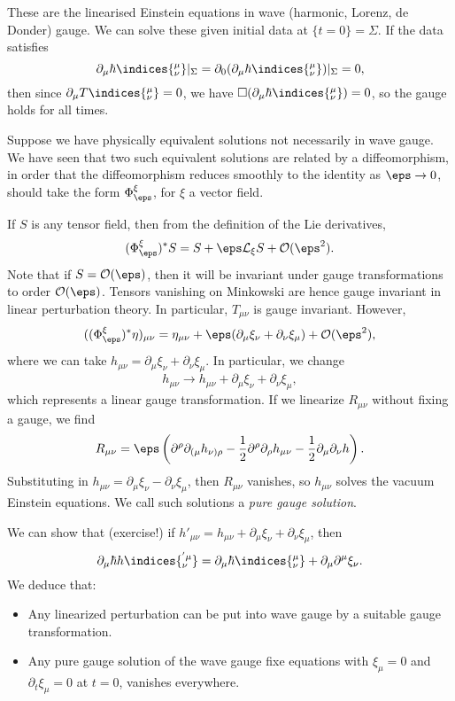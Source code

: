 \documentclass[12pt]{article}
\begin{document}
These are the linearised Einstein equations in wave (harmonic, Lorenz, de Donder) gauge. We can solve these given initial data at $\{t = 0\} = \Sigma$. If the data satisfies
\[
\partial_\mu \hbar\indices{^{\mu}_{\nu}} |_\Sigma = \partial_0(\partial_\mu \hbar\indices{^{\mu}_{\nu}})|_\Sigma = 0,
\]
then since $\partial_\mu T\indices{^{\mu}_{\nu}} = 0$, we have $\square (\partial_\mu \hbar\indices{^{\mu}_{\nu}}) = 0$, so the gauge holds for all times.

Suppose we have physically equivalent solutions not necessarily in wave gauge. We have seen that two such equivalent solutions are related by a diffeomorphism, in order that the diffeomorphism reduces smoothly to the identity as $\eps \to 0$, should take the form $\Phi^{\xi}_\eps$, for $\xi$ a vector field.

If $S$ is any tensor field, then from the definition of the Lie derivatives,
\[
	(\Phi^{\xi}_\eps)^{\ast} S = S + \eps \mathcal{L}_\xi S + \mathcal{O}(\eps^2).
\]
Note that if $S = \mathcal{O}(\eps)$, then it will be invariant under gauge transformations to order $\mathcal{O}(\eps)$. Tensors vanishing on Minkowski are hence gauge invariant in linear perturbation theory. In particular, $T_{\mu\nu}$ is gauge invariant. However,
\[
	((\Phi^\xi_\eps)^{\ast} \eta)_{\mu\nu} = \eta_{\mu\nu} + \eps (\partial_\mu \xi_\nu + \partial_\nu \xi_\mu) + \mathcal{O}(\eps ^2),
\]
where we can take $h_{\mu\nu} = \partial_\mu \xi_\nu + \partial_\nu \xi_\mu$. In particular, we change
\[
h_{\mu\nu} \to h_{\mu\nu} + \partial_\mu \xi_\nu + \partial_\nu \xi_\mu,
\]
which represents a linear gauge transformation. If we linearize $R_{\mu\nu}$ without fixing a gauge, we find
\[
R_{\mu\nu} = \eps\left(\partial^\rho \partial_{(\mu} h_{\nu)\rho} - \frac{1}{2} \partial^\rho \partial_\rho h_{\mu\nu} - \frac 12 \partial_\mu \partial_\nu h \right).
\]
Substituting in $h_{\mu\nu} = \partial_\mu \xi_\nu - \partial_\nu \xi_\mu$, then $R_{\mu\nu}$ vanishes, so $h_{\mu\nu}$ solves the vacuum Einstein equations. We call such solutions a \emph{pure gauge solution}.

We can show that (exercise!) if $h'_{\mu\nu} = h_{\mu\nu} + \partial_\mu \xi_\nu + \partial_\nu \xi_\mu$, then
\[
\partial_\mu \hbar h\indices{^{'\mu}_{\nu}} = \partial_\mu \hbar\indices{^{\mu}_{\nu}} + \partial_\mu \partial^\mu \xi_\nu.
\]
We deduce that:
\begin{itemize}
	\item Any linearized perturbation can be put into wave gauge by a suitable gauge transformation.
	\item Any pure gauge solution of the wave gauge fixe equations with $\xi_\mu = 0$ and $\partial_t \xi_\mu = 0$ at $t = 0$, vanishes everywhere.
\end{itemize}
\end{document}
